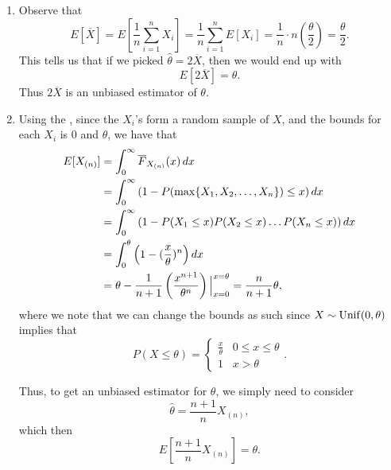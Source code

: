 \documentclass[notoc,notitlepage]{tufte-book}
\begin{document}
\begin{solution}
  \begin{enumerate}
    \item Observe that
      \begin{equation*}
        E[\overline{X}] = E \left[ \frac{1}{n} \sum_{i=1}^{n} X_i \right] =
        \frac{1}{n} \sum_{i=1}^{n} E[X_i] = \frac{1}{n} \cdot n \left(
        \frac{\theta}{2} \right) = \frac{\theta}{2}.
      \end{equation*}
      This tells us that if we picked $\hat{\theta} = 2\overline{X}$, then we
      would end up with
      \begin{equation*}
        E[2\overline{X}] = \theta.
      \end{equation*}
      Thus $2\overline{X}$ is an unbiased estimator of $\theta$.

    \item Using the  , since the $X_i$'s form a random sample of $X$, and the bounds for each
      $X_i$ is $0$ and $\theta$, we have that
      \begin{align*}
        E[X_{(n)}]
        &= \int_{0}^{\infty} \overline{F}_{X_{(n)}}(x) \mathop{}\!d{x} \\
        &= \int_{0}^{\infty} \left( 1 - P(\max\{X_1, X_2, \ldots, X_n\}) \leq x
          \right) \mathop{}\!d{x} \\
        &= \int_{0}^{\infty} \left( 1 - P(X_1 \leq x)P(X_2 \leq x)\hdots P(X_n
          \leq x) \right) \mathop{}\!d{x} \\
        &= \int_{0}^{\theta} \left( 1 - (\frac{x}{\theta})^n \right) \mathop{}\!d{x} \\
        &= \theta - \frac{1}{n+1} \left( \frac{x^{n+1}}{\theta^n}
        \right)\Big|_{x=0}^{x=\theta} = \frac{n}{n+1} \theta,
      \end{align*}
      where we note that we can change the bounds as such since $X \sim \operatorname{Unif}(0,
      \theta)$ implies that
      \begin{equation*}
        P(X \leq \theta) = \begin{cases}
          \frac{x}{\theta} & 0 \leq x \leq \theta \\
          1                & x > \theta
        \end{cases}.
      \end{equation*}

      Thus, to get an unbiased estimator for $\theta$, we simply need to
      consider
      \begin{equation*}
        \hat{\theta} = \frac{n+1}{n} X_{(n)},
      \end{equation*}
      which then
      \begin{equation*}
        E \left[ \frac{n+1}{n} X_{(n)} \right] = \theta.
      \end{equation*}
  \end{enumerate}
\end{solution}
\end{document}
